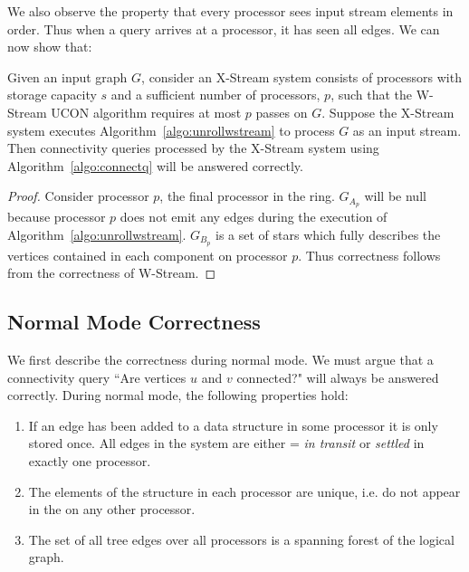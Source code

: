 We also observe the property that 
every processor sees input stream elements in order. Thus when a query arrives at a processor, it has seen all edges. We can now show that:
 \begin{lemma}
 Given an input graph $G$, consider an X-Stream system consists of processors with storage capacity $s$ and a sufficient number of processors, $p$, such that the W-Stream UCON algorithm requires at most $p$ passes on $G$. Suppose the X-Stream system executes Algorithm~\ref{algo:unrollwstream} to process $G$ as an input stream. Then
connectivity queries processed by the X-Stream system using Algorithm~\ref{algo:connectq} will be answered correctly. \end{lemma}
\begin{proof}
Consider processor $p$, the final processor in the ring. $G_{A_p}$ will be null because processor $p$ does not emit any edges during the execution of Algorithm~\ref{algo:unrollwstream}. 
$G_{B_p}$ is a set of stars which fully describes the vertices contained in each component on processor $p$. Thus correctness follows from the correctness of W-Stream.
\end{proof}


\subsection{Normal Mode Correctness}
We first describe the correctness during normal mode. We must argue that a connectivity query ``Are vertices $u$ and $v$ connected?" will always be answered correctly. During normal mode, the following properties hold:

\begin{enumerate}
\item If an edge has been added to a data structure in some processor it is only stored once. All edges in the system are either = \emph{in transit} or \emph{settled} in exactly one processor.   \label{prop:edgeonce}
\item The elements of the \uf structure in each processor are unique, i.e. do not appear in the \uf on any other processor.   \label{prop:onelc}
\item The set of all  tree edges over all processors is a spanning forest of the logical graph. \label{prop:nontree}
\end{enumerate}

